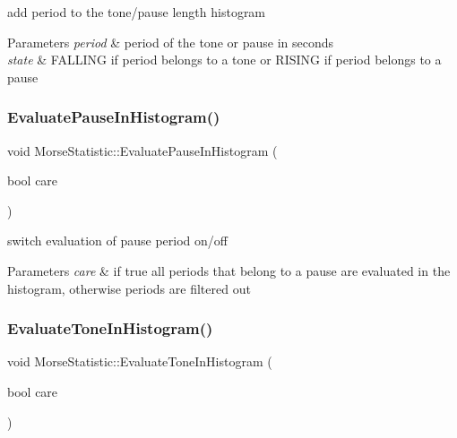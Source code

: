 add period to the tone/pause length histogram 


\begin{DoxyParams}{Parameters}
{\em period} & period of the tone or pause in seconds \\
\hline
{\em state} & F\+A\+L\+L\+I\+NG if period belongs to a tone or R\+I\+S\+I\+NG if period belongs to a pause \\
\hline
\end{DoxyParams}
\mbox{\label{classMorseStatistic_aabfa04ea2d9664fd2d2434698243bbae}} 
\subsubsection{\texorpdfstring{Evaluate\+Pause\+In\+Histogram()}{EvaluatePauseInHistogram()}}
{\footnotesize\ttfamily void Morse\+Statistic\+::\+Evaluate\+Pause\+In\+Histogram (\begin{DoxyParamCaption}\item[{bool}]{care }\end{DoxyParamCaption})}



switch evaluation of pause period on/off 


\begin{DoxyParams}{Parameters}
{\em care} & if true all periods that belong to a pause are evaluated in the histogram, otherwise periods are filtered out \\
\hline
\end{DoxyParams}
\mbox{\label{classMorseStatistic_a6ba988ce121e1f99cff841f5db6265f8}} 
\subsubsection{\texorpdfstring{Evaluate\+Tone\+In\+Histogram()}{EvaluateToneInHistogram()}}
{\footnotesize\ttfamily void Morse\+Statistic\+::\+Evaluate\+Tone\+In\+Histogram (\begin{DoxyParamCaption}\item[{bool}]{care }\end{DoxyParamCaption})}




